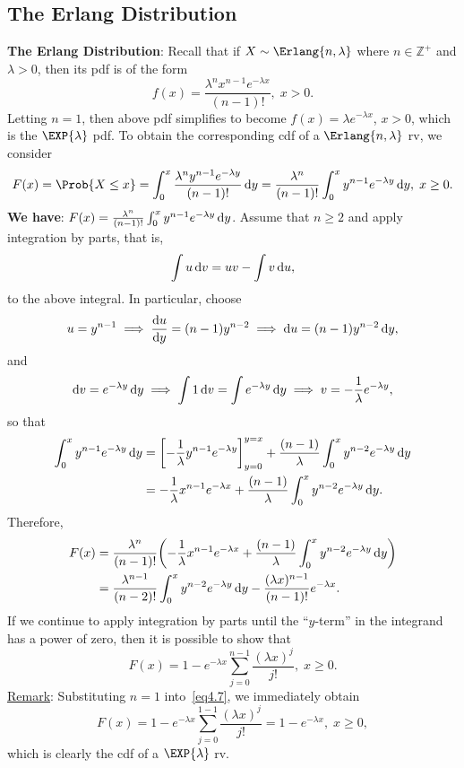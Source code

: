 \subsection*{The Erlang Distribution}
\begin{Regular}
    \textbf{The Erlang Distribution}: Recall that if $ X \sim \Erlang{n,\lambda} $ where $ n\in\mathbb{Z}^+ $ and $ \lambda>0 $, then its pdf is of the form
    \[ f(x)=\frac{\lambda^n x^{n-1}e^{-\lambda x}}{(n-1)!},\;x>0. \]
    Letting $ n=1 $, then above pdf simplifies to become $ f(x)=\lambda e^{-\lambda x} $, $ x>0 $, which is the $ \EXP{\lambda} $ pdf. To
    obtain the corresponding cdf of a $ \Erlang{n,\lambda} $ rv, we consider
    \[ F(x)=\Prob{X\le x}=\int_{0}^{x}\frac{\lambda^n y^{n-1}e^{-\lambda y}}{(n-1)!}\odif{y}=
        \frac{\lambda^n}{(n-1)!}\int_{0}^{x}y^{n-1}e^{-\lambda y}\odif{y},\; x\ge 0. \]
    \textbf{We have}: $ F(x)=\frac{\lambda^n}{(n-1)!}\int_{0}^{x}y^{n-1}e^{-\lambda y}\odif{y} $. Assume that $ n\ge 2 $ and apply integration by parts, that is,
    \[ \int u\odif{v}=uv-\int v\odif{u}, \]
    to the above integral. In particular, choose
    \[ u=y^{n-1}\implies \odv{u}{y}=(n-1)y^{n-2}\implies\odif{u}=(n-1)y^{n-2}\odif{y}, \]
    and
    \[ \odif{v}=e^{-\lambda y}\odif{y}\implies \int 1\odif{v}=\int e^{-\lambda y}\odif{y}\implies v=-\frac{1}{\lambda}e^{-\lambda y}, \]
    so that
    \begin{align*}
        \int_{0}^{x}y^{n-1}e^{-\lambda y}\odif{y}
         & =\biggl[-\frac{1}{\lambda}y^{n-1}e^{-\lambda y}\biggr]_{y=0}^{y=x}+\frac{(n-1)}{\lambda}\int_{0}^{x}y^{n-2}e^{-\lambda y}\odif{y} \\
         & =-\frac{1}{\lambda}x^{n-1}e^{-\lambda x}+\frac{(n-1)}{\lambda}\int_{0}^{x}y^{n-2}e^{-\lambda y}\odif{y}.
    \end{align*}
    Therefore,
    \begin{align*}
        F(x)
         & =\frac{\lambda^n}{(n-1)!}\biggl(-\frac{1}{\lambda}x^{n-1}e^{-\lambda x}+\frac{(n-1)}{\lambda}\int_{0}^{x}y^{n-2}e^{-\lambda y}\odif{y}\biggr) \\
         & =\frac{\lambda^{n-1}}{(n-2)!}\int_{0}^{x}y^{n-2}e^{-\lambda y}\odif{y}-\frac{(\lambda x)^{n-1}}{(n-1)!}e^{-\lambda x}.
    \end{align*}
    If we continue to apply integration by parts until the ``$ y $-term'' in the integrand has a power of zero, then it is possible to show that
    \[ F(x)=1-e^{-\lambda x}\sum_{j=0}^{n-1}\frac{(\lambda x)^j}{j!},\; x\ge 0.\tag*{(4.7)}\label{eq4.7} \]
    \tcblower{}
    \underline{Remark}: Substituting $ n=1 $ into~\ref{eq4.7}, we immediately obtain
    \[ F(x)=1-e^{-\lambda x}\sum_{j=0}^{1-1}\frac{(\lambda x)^j}{j!}=1-e^{-\lambda x},\; x\ge 0, \]
    which is clearly the cdf of a $ \EXP{\lambda} $ rv.


\end{Regular}
